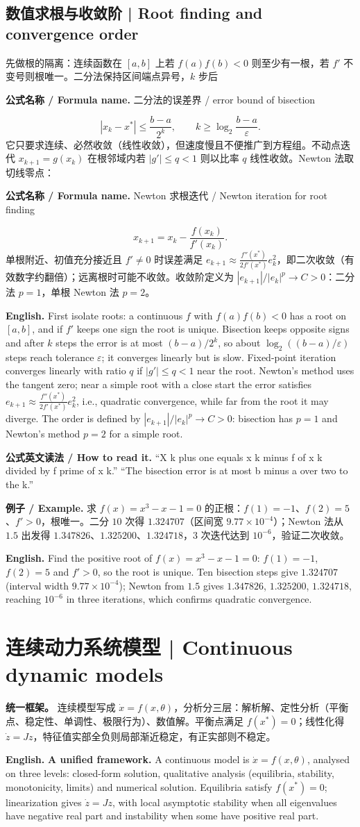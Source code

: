 \documentclass[UTF8,11pt,a4paper]{ctexart}
\newcommand{\EN}[1]{\par\noindent\textbf{English.} #1\par}
\newcommand{\READ}[1]{\par\noindent\textbf{公式英文读法 / How to read it.} #1\par}
\newcommand{\FORMULA}[2]{\par\noindent\textbf{公式名称 / Formula name.} #1 / #2\par}
\newcommand{\EX}[2]{\par\noindent\textbf{例子 / Example.} #1\par\EN{#2}}
\begin{document}
\subsection{数值求根与收敛阶 | Root finding and convergence order}
先做根的隔离：连续函数在 $[a,b]$ 上若 $f(a)f(b)<0$ 则至少有一根，若 $f'$ 不变号则根唯一。二分法保持区间端点异号，$k$ 步后
\FORMULA{二分法的误差界}{error bound of bisection}
\[
|x_k-x^*|\le\frac{b-a}{2^k},\qquad k\ge\log_2\frac{b-a}{\varepsilon}.
\]
它只要求连续、必然收敛（线性收敛），但速度慢且不便推广到方程组。不动点迭代 $x_{k+1}=g(x_k)$ 在根邻域内若 $|g'|\le q<1$ 则以比率 $q$ 线性收敛。Newton 法取切线零点：
\FORMULA{Newton 求根迭代}{Newton iteration for root finding}
\[
x_{k+1}=x_k-\frac{f(x_k)}{f'(x_k)} .
\]
单根附近、初值充分接近且 $f'\ne0$ 时误差满足 $e_{k+1}\approx\frac{f''(x^*)}{2f'(x^*)}e_k^2$，即二次收敛（有效数字约翻倍）；远离根时可能不收敛。收敛阶定义为 $|e_{k+1}|/|e_k|^p\to C>0$：二分法 $p=1$，单根 Newton 法 $p=2$。
\EN{First isolate roots: a continuous $f$ with $f(a)f(b)<0$ has a root on $[a,b]$, and if $f'$ keeps one sign the root is unique. Bisection keeps opposite signs and after $k$ steps the error is at most $(b-a)/2^k$, so about $\log_2((b-a)/\varepsilon)$ steps reach tolerance $\varepsilon$; it converges linearly but is slow. Fixed-point iteration converges linearly with ratio $q$ if $|g'|\le q<1$ near the root. Newton's method uses the tangent zero; near a simple root with a close start the error satisfies $e_{k+1}\approx\frac{f''(x^*)}{2f'(x^*)}e_k^2$, i.e., quadratic convergence, while far from the root it may diverge. The order is defined by $|e_{k+1}|/|e_k|^p\to C>0$: bisection has $p=1$ and Newton's method $p=2$ for a simple root.}
\READ{“X k plus one equals x k minus f of x k divided by f prime of x k.” “The bisection error is at most b minus a over two to the k.”}
\EX{求 $f(x)=x^3-x-1=0$ 的正根：$f(1)=-1$、$f(2)=5$、$f'>0$，根唯一。二分 $10$ 次得 $1.324707$（区间宽 $9.77\times10^{-4}$）；Newton 法从 $1.5$ 出发得 $1.347826$、$1.325200$、$1.324718$，$3$ 次迭代达到 $10^{-6}$，验证二次收敛。}{Find the positive root of $f(x)=x^3-x-1=0$: $f(1)=-1$, $f(2)=5$ and $f'>0$, so the root is unique. Ten bisection steps give $1.324707$ (interval width $9.77\times10^{-4}$); Newton from $1.5$ gives $1.347826$, $1.325200$, $1.324718$, reaching $10^{-6}$ in three iterations, which confirms quadratic convergence.}


\section{连续动力系统模型 | Continuous dynamic models}
\noindent\textbf{统一框架。} 连续模型写成 $\dot x=f(x,\theta)$，分析分三层：解析解、定性分析（平衡点、稳定性、单调性、极限行为）、数值解。平衡点满足 $f(x^*)=0$；线性化得 $\dot z=Jz$，特征值实部全负则局部渐近稳定，有正实部则不稳定。
\EN{\textbf{A unified framework.} A continuous model is $\dot x=f(x,\theta)$, analysed on three levels: closed-form solution, qualitative analysis (equilibria, stability, monotonicity, limits) and numerical solution. Equilibria satisfy $f(x^*)=0$; linearization gives $\dot z=Jz$, with local asymptotic stability when all eigenvalues have negative real part and instability when some have positive real part.}
\end{document}
